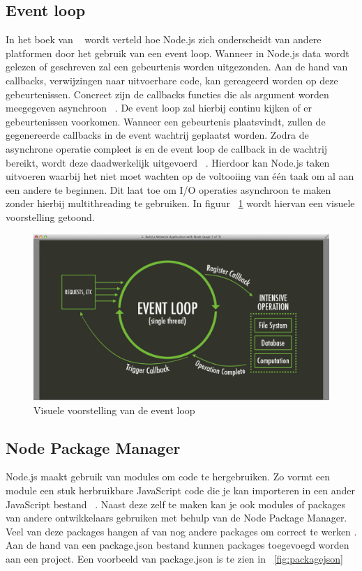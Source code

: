 \subsection{Event loop}
In het boek van ~\textcite{Ali2013} wordt verteld hoe Node.js zich onderscheidt van andere platformen door het gebruik van een event loop.
Wanneer in Node.js data wordt gelezen of geschreven zal een gebeurtenis worden uitgezonden. 
Aan de hand van callbacks, verwijzingen naar uitvoerbare code, kan gereageerd worden op deze gebeurtenissen. 
Concreet zijn de callbacks functies die als argument worden meegegeven asynchroon ~\autocite{Kumar2023}. 
De event loop zal hierbij continu kijken of er gebeurtenissen voorkomen. Wanneer een gebeurtenis plaatsvindt, zullen de gegenereerde callbacks in de event wachtrij geplaatst worden.
Zodra de asynchrone operatie compleet is en de event loop de callback in de wachtrij bereikt, wordt deze daadwerkelijk uitgevoerd ~\autocite{Kumar2023}.
Hierdoor kan Node.js taken uitvoeren waarbij het niet moet wachten op de voltooiing van één taak om al aan een andere te beginnen. 
Dit laat toe om I/O operaties asynchroon te maken zonder hierbij multithreading te gebruiken.
In figuur ~\ref{fig:eventloop} wordt hiervan een visuele voorstelling getoond.
\begin{figure}[h]
    \centering
    \includegraphics[width=.9\textwidth]{graphics/eventloop.png}
    \caption[Voorstelling event loop]{\label{fig:eventloop}Visuele voorstelling van de event loop ~\autocite{Luxembourg2023}}
\end{figure}

\subsection{Node Package Manager}
Node.js maakt gebruik van modules om code te hergebruiken. 
Zo vormt een module een stuk herbruikbare JavaScript code 
die je kan importeren in een ander JavaScript bestand ~\autocite{Semah2022}.
Naast deze zelf te maken kan je ook modules of packages van andere ontwikkelaars gebruiken met behulp van de Node Package Manager.
Veel van deze packages hangen af van nog andere packages om correct te werken \autocite{kula2017}.
Aan de hand van een package.json bestand kunnen packages toegevoegd worden aan een project. 
Een voorbeeld van package.json is te zien in ~\ref{fig:packagejson}


